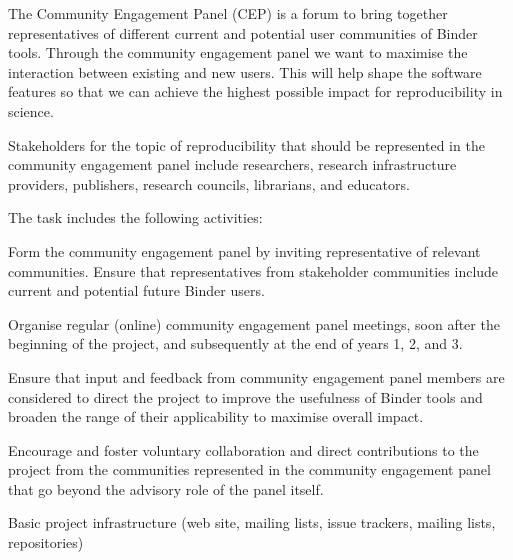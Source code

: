 \begin{workpackage}[id=management,type=MGT,wphases=0-36!.44,
  title=Project Management,
  short=Management,
  lead=SRL,
  MPRM=1,
  QSRM=1,
  IFRRM=1,
  UIORM=1,
  SRLRM=12,
  swsites
]
\begin{tasklist}
\begin{task}[
  title=Community Engagement Panel,
  id=community-engagement-panel,
  lead=SRL,
  PM=2,
  wphases={0-36!.056},
  partners={MP,QS,UIO,IFR},
  ]
  The Community Engagement Panel (CEP) is a forum to bring together
  representatives of different current and potential user communities of Binder tools.
  Through the community engagement panel we want to maximise the interaction between existing and new users.
  This will help shape the software features so that we can
  achieve the highest possible impact for reproducibility in science.

  Stakeholders for the topic of reproducibility that should be represented in the
  community engagement panel include researchers, research infrastructure
  providers, publishers, research councils, librarians, and educators.

The task includes the following activities:
\begin{compactenum}
\item Form the community engagement panel by inviting representative of relevant
  communities. Ensure that representatives from stakeholder communities include
  current and potential future Binder users.
\item Organise regular (online) community engagement panel meetings, soon after the
  beginning of the project, and subsequently at the end of years 1, 2, and 3.
\item Ensure that input and feedback from community engagement panel members are
  considered to direct the project to improve the usefulness of Binder tools
  and broaden the range of their applicability to maximise overall impact.
\item Encourage and foster voluntary collaboration and direct contributions to
  the project from the communities represented in the community engagement
  panel that go beyond the advisory role of the panel itself.
\end{compactenum}


\end{task}
\end{tasklist}


\begin{wpdelivs}

\begin{wpdeliv}[due=2,miles=startup,id=infrastructure,dissem=PU,nature=DEC,lead=SRL]
  {Basic project infrastructure (web site, mailing lists, issue trackers, mailing lists, repositories)}
\end{wpdeliv}


\end{wpdelivs}
\end{workpackage}
